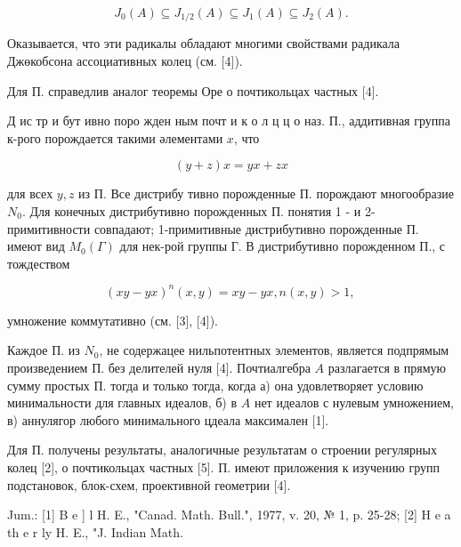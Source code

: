 \documentclass[10pt]{article}
\begin{document}
\[

J_{0}(A) \subseteq J_{1 / 2}(A) \subseteq J_{1}(A) \subseteq J_{2}(A) .

\]



Оказывается, что эти радикалы обладают многими свойствами радикала Джөкобсона ассоциативных колец (см. [4]).



Для П. справедлив аналог теоремы Оре о почтикольцах частных [4].



Д ис тр и бут ивно поро жден ным почт и к о л ц ц о наз. П., аддитивная группа к-рого порождается такими әлементами $x$, что



\[

(y+z) x=y x+z x

\]



для всех $y, z$ из П. Все дистрибу тивно порожденные П. порождают многообразие $N_{0}$. Для конечных дистрибутивно порожденных П. понятия 1 - и 2-примитивности совпадают; 1-примитивные дистрибутивно порожденные П. имеют вид $M_{0}(\Gamma)$ для нек-рой группы Г. В дистрибутивно порожденном П., с тождеством



\[

(x y-y x)^{n}(x, y)=x y-y x, n(x, y)>1 \text {, }

\]



умножение коммутативно (см. [3], [4]).



Каждое П. из $N_{0}$, не содержацее нильпотентных элементов, является подпрямым произведением П. без делителей нуля [4]. Почтиалгебра $A$ разлагается в прямую сумму простых П. тогда и только тогда, когда а) она удовлетворяет условию минимальности для главных идеалов, б) в $A$ нет идеалов с нулевым умножением, в) аннулягор любого минимального цдеала максимален [1].



Для П. получены результаты, аналогичные результатам о строении регулярных колец [2], о почтикольцах частных [5]. П. имеют приложения к изучению групп подстановок, блок-схем, проективной геометрии [4].



Jum.: [1] B e ] l H. E., "Canad. Math. Bull.", 1977, v. 20, № 1, p. 25-28; [2] H e a th e r ly H. E., "J. Indian Math.
\end{document}
